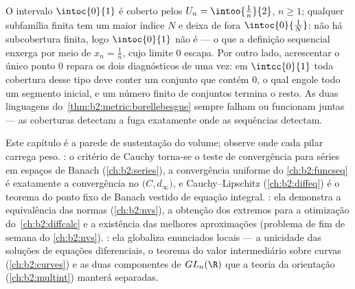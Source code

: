 \begin{example}\label{ex:b2:metric:covers}
O intervalo  $\intoc{0}{1}$ é coberto pelos 
$U_n = \intoo{\frac1n}{2}$, $n \geq 1$; qualquer subfamília finita tem um
maior índice $N$ e deixa de fora $\intoc{0}{\frac1N}$: não há subcobertura
finita, logo $\intoc{0}{1}$ não é  --- o que a
definição sequencial enxerga por meio de $x_n = \frac1n$, cujo limite
$0$ escapa. Por outro lado, acrescentar o único ponto $0$
repara os dois diagnósticos de uma vez: em $\intcc{0}{1}$ toda cobertura desse tipo
deve conter um conjunto que contém $0$, o qual engole todo um segmento
inicial, e um número finito de conjuntos termina o resto. As duas linguagens
do~\cref{thm:b2:metric:borellebesgue} sempre falham ou funcionam
juntas --- as coberturas detectam a fuga exatamente onde as sequências detectam.
\end{example}

\begin{remark}\label{rem:b2:metric:perspectives}
Este capítulo é a parede de sustentação do volume; observe onde
cada pilar carrega peso. \emph{}: o critério de
Cauchy torna-se o teste de convergência para séries em espaços de
Banach (\cref{ch:b2:series}), a convergência uniforme do
\cref{ch:b2:funcseq} é exatamente a convergência no 
$\bigl(C, d_\infty\bigr)$, e Cauchy--Lipschitz
(\cref{ch:b2:diffeq}) é o teorema do ponto fixo de Banach vestido
de equação integral. \emph{}: ela demonstra a
equivalência das normas (\cref{ch:b2:nvs}), a obtenção dos
extremos para a otimização do~\cref{ch:b2:diffcalc} e a
existência das melhores aproximações (problema de fim de semana do
\cref{ch:b2:nvs}). \emph{}: ela globaliza enunciados locais
--- a unicidade das soluções de equações diferenciais, o
teorema do valor intermediário sobre curvas (\cref{ch:b2:curves}) e
as duas componentes de $GL_n(\R)$ que a teoria da orientação
(\cref{ch:b2:multint}) manterá separadas.
\end{remark}

